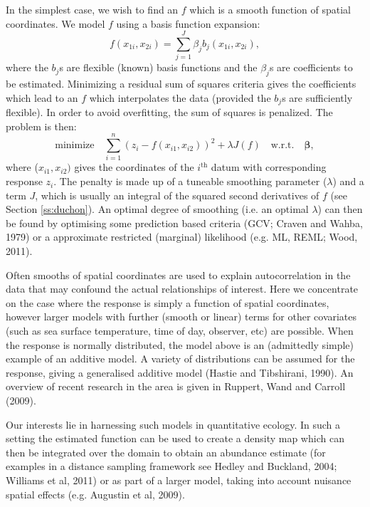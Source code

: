 \documentclass[useAMS, referee]{biom}
\begin{document}
In the simplest case, we wish to find an $f$ which is a smooth function of spatial coordinates. We model $f$ using a basis function expansion:
\begin{equation}
f(x_{1i}, x_{2i}) = \sum_{j=1}^J \beta_j b_j(x_{1i}, x_{2i}),
\label{basis-exp}
\end{equation}
where the $b_j$s are flexible (known) basis functions and the $\beta_j$s are coefficients to be estimated. Minimizing a residual sum of squares criteria gives the coefficients which lead to an $f$ which interpolates the data (provided the $b_j$s are sufficiently flexible). In order to avoid overfitting, the sum of squares is penalized. The problem is then: 
\begin{equation}
\text{minimize} \quad \sum_{i=1}^n \left ( z_i - f(x_{i1},x_{i2}) \right )^2 + \lambda J\left( f \right) \quad \text{w.r.t.} \quad \bm{\beta},
\end{equation}
where ($x_{i1},x_{i2})$ gives the coordinates of the $i^\text{th}$ datum with corresponding response $z_i$. The penalty is made up of a tuneable smoothing parameter ($\lambda$) and a term $J$, which is usually an integral of the squared second derivatives of $f$ (see Section \ref{ss:duchon}). An optimal degree of smoothing (i.e. an optimal $\lambda$) can then be found by optimising some prediction based criteria (GCV; Craven and Wahba, 1979) or a approximate restricted (marginal) likelihood (e.g. ML, REML; Wood, 2011). 

Often smooths of spatial coordinates are used to explain autocorrelation in the data that may confound the actual relationships of interest. Here we concentrate on the case where the response is simply a function of spatial coordinates, however larger models with further (smooth or linear) terms for other covariates (such as sea surface temperature, time of day, observer, etc) are possible. When the response is normally distributed, the model above is an (admittedly simple) example of an additive model. A variety of distributions can be assumed for the response, giving a generalised additive model (Hastie and Tibshirani, 1990). An overview of recent research in the area is given in Ruppert, Wand and Carroll (2009). 

Our interests lie in harnessing such models in quantitative ecology. In such a setting the estimated function can be used to create a density map which can then be integrated over the domain to obtain an abundance estimate (for examples in a distance sampling framework see Hedley and Buckland, 2004; Williams et al, 2011) or as part of a larger model, taking into account nuisance spatial effects (e.g. Augustin et al, 2009). 
\end{document}
